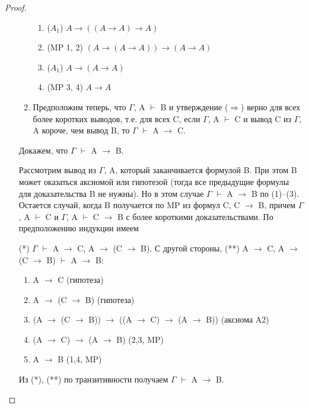 \documentclass[a4paper]{article}
\theoremstyle{definition}
\theoremstyle{remark}
\begin{document}
\begin{proof}
\begin{itemize}
\begin{enumerate}
\begin{enumerate}
                        \item ($A_1$) $A\rightarrow ((A\rightarrow A)\rightarrow A)$ 
                        \item (MP 1, 2) $(A\rightarrow(A\rightarrow A))\rightarrow(A\rightarrow A)$
                        \item ($A_1$) $A\rightarrow (A\rightarrow A)$ 
                        \item (MP 3, 4) $A\rightarrow A$
                    \end{enumerate}
                \item Предположим теперь, что $\Gamma$, A $\vdash$ B и утверждение ($\Rightarrow$) верно для
                всех более коротких выводов, т.е.
                для всех C, если $\Gamma$, A $\vdash$ C и вывод C из $\Gamma$, A короче, чем вывод B, то
                $\Gamma$ $\vdash$ A $\rightarrow$ C.
            \end{enumerate}
            Докажем, что $\Gamma$ $\vdash$ A $\rightarrow$ B.
            
            Рассмотрим вывод из $\Gamma$, A, который заканчивается формулой B. При
            этом B может оказаться аксиомой или гипотезой (тогда все предыдущие
            формулы для доказательства B не нужны). Но в этом случае $\Gamma$ $\vdash$ A $\rightarrow$ B
            по (1)–(3).
            Остается случай, когда B получается по MP из формул C, C $\rightarrow$ B, причем $\Gamma$, A $\vdash$ C и $\Gamma$, A $\vdash$ C $\rightarrow$ B с более короткими доказательствами. По
            предположению индукции имеем
            
            (*) $\Gamma$ $\vdash$ A $\rightarrow$ C, A $\rightarrow$ (C $\rightarrow$ B).
            С другой стороны,
            (**) A $\rightarrow$ C, A $\rightarrow$ (C $\rightarrow$ B) $\vdash$ A $\rightarrow$ B:
            \begin{enumerate}
                \item A $\rightarrow$ C (гипотеза)
                \item A $\rightarrow$ (C $\rightarrow$ B) (гипотеза)
                \item (A $\rightarrow$ (C $\rightarrow$ B)) $\rightarrow$ ((A $\rightarrow$ C) $\rightarrow$ (A $\rightarrow$ B)) (аксиома A2)
                \item (A $\rightarrow$ C) $\rightarrow$ (A $\rightarrow$ B) (2,3, MP)
                \item A $\rightarrow$ B (1,4, MP)
            \end{enumerate}
            Из (*), (**) по транзитивности получаем $\Gamma$ $\vdash$ A $\rightarrow$ B.
        \end{itemize}
    \end{proof}
\end{document}
